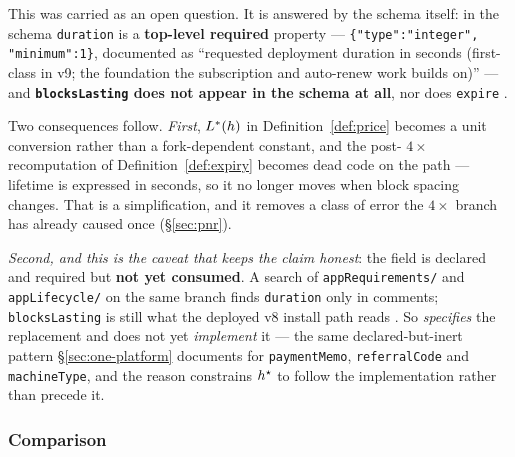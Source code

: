\begin{remark}
\label{rem:v9-duration}
This was carried as an open question. It is answered by the schema itself: in the  schema
\texttt{duration} is a \textbf{top-level required} property --- \texttt{\{"type":"integer",\allowbreak{}
"minimum":1\}}, documented as ``requested deployment duration in seconds (first-class in v9; the
foundation the subscription and auto-renew work builds on)'' --- and \textbf{\texttt{blocksLasting}
does not appear in the  schema at all}, nor does \texttt{expire}
.

Two consequences follow. \emph{First}, $L^{\ast}(h)$ in Definition~\ref{def:price} becomes a unit
conversion rather than a fork-dependent constant, and the post-\PoN{} $4\times$ recomputation of
Definition~\ref{def:expiry} becomes dead code on the  path --- lifetime is expressed in
seconds, so it no longer moves when block spacing changes. That is a simplification, and it removes
a class of error the $4\times$ branch has already caused once (\S\ref{sec:pnr}).

\emph{Second, and this is the caveat that keeps the claim honest}: the field is declared and required
but \textbf{not yet consumed}. A search of \texttt{app\allowbreak{}Requirements/\allowbreak{}} and \texttt{appLifecycle/} on the
same branch finds \texttt{duration} only in comments; \texttt{blocksLasting} is still what the
deployed v8 install path reads .
So  \emph{specifies} the replacement and does not yet \emph{implement} it --- the same
declared-but-inert pattern \S\ref{sec:one-platform} documents for \texttt{paymentMemo},
\texttt{referralCode} and \texttt{machineType}, and the reason  constrains
$h^{\star}$ to follow the implementation rather than precede it.
\end{remark}

\subsubsection{Comparison}

